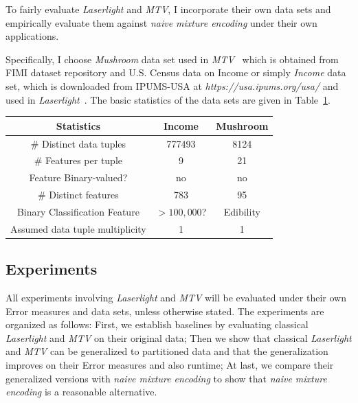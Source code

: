 To fairly evaluate \textit{Laserlight} and \textit{MTV}, I incorporate their own data sets and empirically evaluate them against \textit{naive mixture encoding} under their own applications.

Specifically, I choose \textit{Mushroom} data set used in \textit{MTV}~\cite{DBLP:journals/tkdd/MampaeyVT12} which is obtained from FIMI dataset repository and U.S. Census data on Income or simply \textit{Income} data set, which is downloaded from IPUMS-USA at \textit{https://usa.ipums.org/usa/} and used in \textit{Laserlight}~\cite{DBLP:journals/pvldb/GebalyAGKS14}.
The basic statistics of the data sets are given in Table~\ref{table:extendeddatasummary}.

\begin{table}[h!]
\centering
{}
\label{table:extendeddatasummary}
{\small \centering
\begin{tabular}{c c c}
\toprule
Statistics & Income & Mushroom \\
\midrule
\# Distinct data tuples & 777493 & 8124\\
\midrule
\# Features per tuple & 9 & 21\\
\midrule
Feature Binary-valued? & no& no\\
\midrule
\# Distinct features & 783 & 95\\
\midrule
Binary Classification Feature & $>100,000$? & Edibility\\
\midrule
Assumed data tuple multiplicity & 1 & 1\\
\bottomrule
\end{tabular}
}
\end{table}

\subsection{Experiments}
\label{sec:evaluatingalternativeapplicationsexperiments}
All experiments involving \textit{Laserlight} and \textit{MTV} will be evaluated under their own Error measures and data sets, unless otherwise stated.
The experiments are organized as follows: First, we establish baselines by evaluating classical \textit{Laserlight} and \textit{MTV} on their original data; Then we show that classical \textit{Laserlight} and \textit{MTV} can be generalized to partitioned data and that the generalization improves on their Error measures and also runtime; At last, we compare their generalized versions with \textit{naive mixture encoding} to show that \textit{naive mixture encoding} is a reasonable alternative.%

